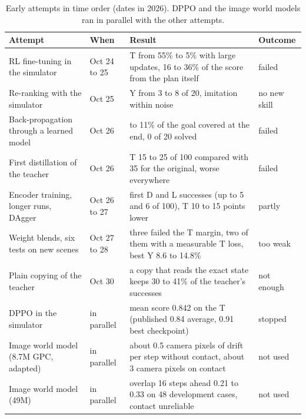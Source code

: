 \documentclass[10pt,twocolumn,letterpaper]{article}
\begin{document}
\begin{table}[!htbp]
  \centering\small
  \caption{Early attempts in time order (dates in 2026). DPPO and the image world models ran in parallel with the
  other attempts.}
  \label{tab:attempts}
  \begin{tabular}{>{\raggedright\arraybackslash}p{4.6cm}l>{\raggedright\arraybackslash}p{7.4cm}%
    >{\raggedright\arraybackslash}p{1.9cm}}
    \toprule
    Attempt & When & Result & Outcome \\
    \midrule
    RL fine-tuning in the simulator & Oct 24 to 25 & T from 55\% to 5\% with large updates, 16 to 36\% of the score
      from the plan itself & failed \\
    Re-ranking with the simulator & Oct 25 & Y from 3 to 8 of 20, imitation within noise & no new skill \\
    Back-propagation through a learned model & Oct 26 & 4 to 11\% of the goal covered at the end, 0 of 20 solved
      & failed \\
    First distillation of the teacher & Oct 26 & T 15 to 25 of 100 compared with 35 for the original, worse everywhere
      & failed \\
    Encoder training, longer runs, DAgger & Oct 26 to 27 & first D and L successes (up to 5 and 6 of 100), T 10 to
      15 points lower & partly \\
    Weight blends, six tests on new scenes & Oct 27 to 28 & three failed the T margin, two of them with a measurable T
      loss, best Y 8.6 to 14.8\% & too weak \\
    Plain copying of the teacher & Oct 30 & a copy that reads the exact state keeps 30 to 41\% of the teacher's
      successes & not enough \\
    DPPO in the simulator & in parallel & mean score 0.842 on the T (published 0.84 average, 0.91 best checkpoint) &
      stopped \\
    Image world model (8.7M GPC, adapted) & in parallel & about 0.5 camera pixels of drift per step without contact,
      about 3 camera pixels on contact & not used \\
    Image world model (49M) & in parallel & overlap 16 steps ahead 0.21 to 0.33 on 48 development cases, contact
      unreliable & not used \\
    \bottomrule
  \end{tabular}
\end{table}

\end{document}
